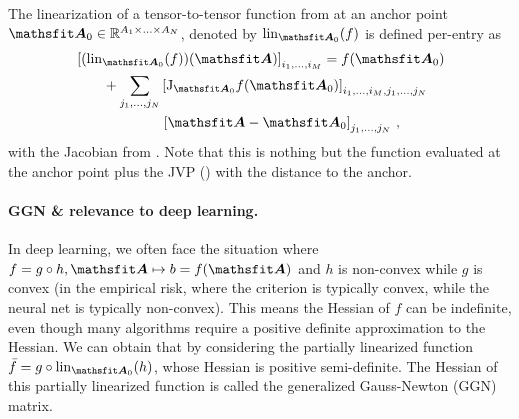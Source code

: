 \switchcolumn[1]
\switchcolumn[0]

\begin{definition}\label{def:tensor_linearization}
  The linearization of a tensor-to-tensor function from  at an anchor point $\tA_0 \in \sR^{A_1 \times \ldots \times A_N}$, denoted by $\lin_{\tA_0}(f)$ is defined per-entry as
  \begin{align*}
    & \left[
      (\lin_{\tA_0}(f))(\tA)
      \right]_{i_1, \ldots, i_M} = f(\tA_0)
    \\
    & \hspace{2em}+
      \sum_{j_1, \ldots, j_N}
      \left[
      \jac_{\tA_0}f(\tA_0)
      \right]_{i_1, \ldots, i_M, j_1, \ldots, j_N}
    \\
    & \hspace{6.2em}\left[
      \tA - \tA_0
      \right]_{j_1, \ldots, j_N}\,,
  \end{align*}
  with the Jacobian from . Note that this is nothing but the function evaluated at the anchor point plus the JVP () with the distance to the anchor.
\end{definition}

\paragraph{GGN \& relevance to deep learning.}
In deep learning, we often face the situation where $f = g \circ h, \tA \mapsto b = f(\tA)$ and $h$ is non-convex while $g$ is convex
(\eg in the empirical risk, where the criterion is typically convex, while the neural net is typically non-convex).
This means the Hessian of $f$ can be indefinite, even though many algorithms require a positive definite approximation to the Hessian.
We can obtain that by considering the partially linearized function $\bar{f} = g \circ \lin_{\tA_0}(h)$, whose Hessian is positive semi-definite.
The Hessian of this partially linearized function is called the generalized Gauss-Newton (GGN) matrix.


